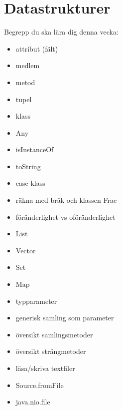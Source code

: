 \chapter{Datastrukturer}\label{chapter:W04}
Begrepp du ska lära dig denna vecka:
\begin{itemize}[noitemsep,label={$\square$},leftmargin=*]
\item attribut (fält)
\item medlem
\item metod
\item tupel
\item klass
\item Any
\item isInstanceOf
\item toString
\item case-klass
\item räkna med bråk och klassen Frac
\item föränderlighet vs oföränderlighet
\item List
\item Vector
\item Set
\item Map
\item typparameter
\item generisk samling som parameter
\item översikt samlingsmetoder
\item översikt strängmetoder
\item läsa/skriva textfiler
\item Source.fromFile
\item java.nio.file\end{itemize}
